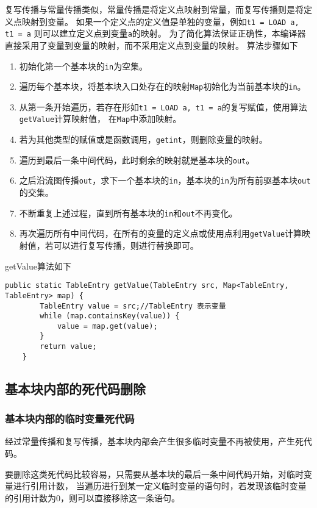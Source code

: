 复写传播与常量传播类似，常量传播是将定义点映射到常量，而复写传播则是将定义点映射到变量。
如果一个定义点的定义值是单独的变量，例如\texttt{t1 = LOAD a, t1 = a} 则可以建立定义点到变量\texttt{a}的映射。
为了简化算法保证正确性，本编译器直接采用了变量到变量的映射，而不采用定义点到变量的映射。
算法步骤如下

\begin{enumerate}
    \item 初始化第一个基本块的\texttt{in}为空集。
    \item 遍历每个基本块，将基本块入口处存在的映射\texttt{Map}初始化为当前基本块的\texttt{in}。
    \item 从第一条开始遍历，若存在形如\texttt{t1 = LOAD a, t1 = a}的复写赋值，使用算法\texttt{getValue}计算映射值，
    在\texttt{Map}中添加映射。
    \item 若为其他类型的赋值或是函数调用，\texttt{getint}，则删除变量的映射。
    \item 遍历到最后一条中间代码，此时剩余的映射就是基本块的\texttt{out}。
    \item 之后沿流图传播\texttt{out}，求下一个基本块的\texttt{in}，基本块的\texttt{in}为所有前驱基本块\texttt{out}的交集。
    \item 不断重复上述过程，直到所有基本块的\texttt{in}和\texttt{out}不再变化。
    \item 再次遍历所有中间代码，在所有的变量的定义点或使用点利用\texttt{getValue}计算映射值，若可以进行复写传播，则进行替换即可。
\end{enumerate}

getValue算法如下

\begin{verbatim}
public static TableEntry getValue(TableEntry src, Map<TableEntry, TableEntry> map) {
        TableEntry value = src;//TableEntry 表示变量
        while (map.containsKey(value)) {
            value = map.get(value);
        }
        return value;
    }
 \end{verbatim}

\subsection{基本块内部的死代码删除}
\subsubsection{基本块内部的临时变量死代码}
经过常量传播和复写传播，基本块内部会产生很多临时变量不再被使用，产生死代码。

要删除这类死代码比较容易，只需要从基本块的最后一条中间代码开始，对临时变量进行引用计数，
当遍历进行到某一定义临时变量的语句时，若发现该临时变量的引用计数为0，则可以直接移除这一条语句。

